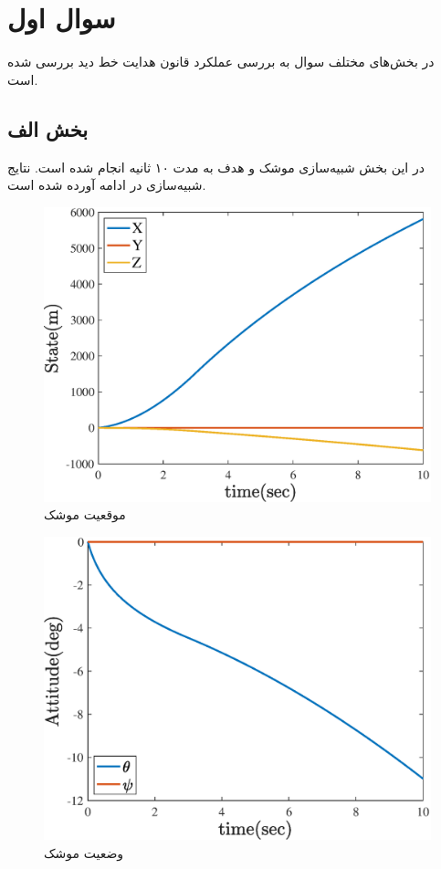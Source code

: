 \section{سوال اول}
در بخش‌های مختلف سوال به بررسی عملکرد قانون هدایت خط دید
بررسی شده است.
\subsection{بخش الف}
در این بخش شبیه‌سازی موشک و هدف به مدت ۱۰ ثانیه انجام شده است. نتایج شبیه‌سازی در ادامه آورده شده است.

\begin{figure}[H]
	\centering
	\includegraphics[width=.75\linewidth]{../Figure/a/missle_state}
	\caption{موقعیت موشک}
\end{figure}

\begin{figure}[H]
	\centering
	\includegraphics[width=.75\linewidth]{../Figure/a/missle_attitude}
	\caption{وضعیت موشک}
\end{figure}

